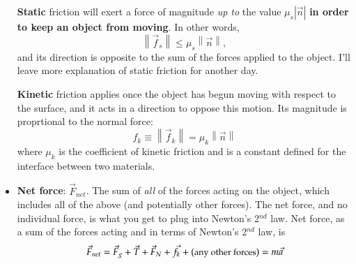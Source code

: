 \documentclass[10pt,letterpaper,twoside]{article}
\begin{document}
\begin{itemize}
	  \textbf{Static} friction will exert a force of magnitude \textit{up to} the value $\mu_s|\vec n|$ \textbf{in order to keep an object from moving}.
	  In other words,
	  $$\left\lVert \vec f_s\right\rVert \le \mu_s\left\lVert \vec n\right\rVert ,$$
	  and its direction is opposite to the sum of the forces applied to the object. I'll leave more explanation of static friction for another day.

	  \textbf{Kinetic} friction applies once the object has begun moving with respect to the surface, and it acts in a direction to oppose this motion.
	  Its magnitude is proprtional to the normal force:
	  $$f_k\equiv\left\lVert \vec f_k\right\rVert  = \mu_k\left\lVert \vec n\right\rVert $$
	  where $\mu_k$ is the coefficient of kinetic friction and is a constant defined for the interface between two materials.
	\item \textbf{Net force}: $\vec F_{net}$.
	  The sum of \textit{all} of the forces acting on the object, which includes all of the above (and potentially other forces).
	  The net force, and no individual force, is what you get to plug into Newton's 2$^{nd}$ law.
	  Net force, as a sum of the forces acting and in terms of Newton's 2$^{nd}$ law, is
	  $$\vec F_{net} = \vec F_g + \vec T + \vec F_{N} + \vec f_{k} + (\text{\small any other forces}) = m\vec a$$
\end{itemize}

\newpage
\end{document}
